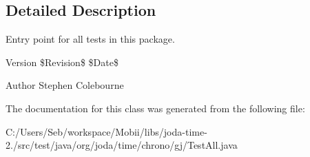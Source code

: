 \subsection{Detailed Description}
Entry point for all tests in this package.

\begin{DoxyVersion}{Version}
\$\-Revision\$ \$\-Date\$
\end{DoxyVersion}
\begin{DoxyAuthor}{Author}
Stephen Colebourne 
\end{DoxyAuthor}


The documentation for this class was generated from the following file\-:\begin{DoxyCompactItemize}
\item 
C\-:/\-Users/\-Seb/workspace/\-Mobii/libs/joda-\/time-\/2./src/test/java/org/joda/time/chrono/gj/Test\-All.\-java\end{DoxyCompactItemize}

